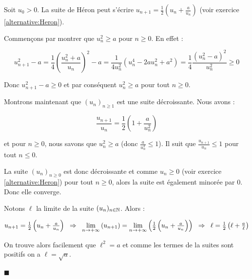 \documentclass[11pt,a4paper,twoside,greek]{report}
\begin{document}
\begin{demonstration}
\medskip
Soit $u_0>0.$ La suite de Héron peut s'écrire $u_{n+1} = \frac12 \left(u_n+\frac{a}{u_n}\right)$ {\small (voir exercice \ref*{alternative:Heron})}.

\smallskip
Commençons par montrer que $u_n^2 \geqslant a$ pour $n\geqslant 0$. En effet :

$$u_{n+1}^2-a = \frac14 \left(\frac{u_n^2 + a}{u_n}\right)^2 - a = \frac{1}{4u_n^2}(u_n^4-2au_n^2+a^2)=\frac14 \frac{(u_n^2-a)^2}{u_n^2}\geqslant 0$$

Donc $u_{n+1}^2 - a \geqslant 0$ et par conséquent $u_{n}^2 \geqslant a$ pour tout $n\geqslant 0$.

\medskip
Montrons maintenant que $(u_n)_{n\ge1}$ est une suite décroissante. Nous avons :

$$\frac{u_{n+1}}{u_n} = \frac12 \left(1+\frac{a}{u_n^2}\right)$$

\smallskip
et pour $n\geqslant 0$, nous savons que $u_n^2 \geqslant a$ (donc $\frac{a}{u_n^2}\leqslant 1$). Il suit que $\frac{u_{n+1}}{u_n} \leqslant 1$ pour tout $n\leqslant 0$.

\medskip
La suite $(u_n)_{n\ge0}$ est donc décroissante et comme $u_n\geqslant 0$ {\small (voir exercice \ref*{alternative:Heron})} pour tout $n\geqslant 0$, alors la suite est également minorée par $0$. Donc elle converge.\clearpage

\medskip
Notons $\ell$ la limite de la suite $(u_n)_{n\in\mathbb{N}}$. Alors :

\smallskip
$$ u_{n+1} = \frac12 \left(u_n+\frac{a}{u_n}\right) \eh{2}\Rightarrow\eh{2}
 \limn{+\infty}{u_{n+1}}= \limn{+\infty}{\frac12 \left(u_n+\frac{a}{u_n}\right)} \eh{2}\Rightarrow\eh{2} \ell = \frac12 \left(\ell+\frac{a}{\ell}\right)$$ 

On trouve alors facilement que  $\ell^2=a$ et comme les termes de la suites sont positifs on a $\ell = \sqrt{a}$.

\vspace{-3mm}
\hfill $\blacksquare$
\end{demonstration}
\end{document}
